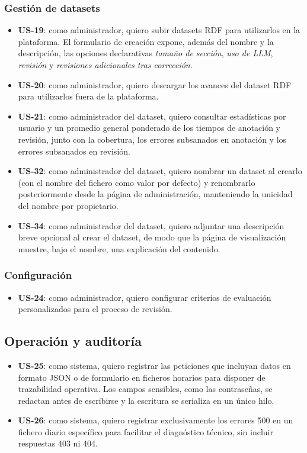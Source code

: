 \subsubsection{Gestión de datasets}
\begin{itemize}
	\item \textbf{US-19}: como administrador, quiero subir datasets RDF para utilizarlos
	      en la plataforma. El formulario de creación expone, además del nombre y la
	      descripción, las opciones declarativas \textit{tamaño de sección}, \textit{uso
		      de LLM}, \textit{revisión} y \textit{revisiones adicionales tras corrección}.
	\item \textbf{US-20}: como administrador, quiero descargar los avances del dataset
	      RDF para utilizarlos fuera de la plataforma.
	\item \textbf{US-21}: como administrador del dataset, quiero consultar estadísticas
	      por usuario y un promedio general ponderado de los tiempos de anotación y
	      revisión, junto con la cobertura, los errores subsanados en anotación y los
	      errores subsanados en revisión.
	\item \textbf{US-32}: como administrador del dataset, quiero nombrar un dataset al
	      crearlo (con el nombre del fichero como valor por defecto) y renombrarlo
	      posteriormente desde la página de administración, manteniendo la unicidad del
	      nombre por propietario.
	\item \textbf{US-34}: como administrador del dataset, quiero adjuntar una descripción
	      breve opcional al crear el dataset, de modo que la página de visualización
	      muestre, bajo el nombre, una explicación del contenido.
\end{itemize}

\subsubsection{Configuración}
\begin{itemize}
	\item \textbf{US-24}: como administrador, quiero configurar criterios de evaluación
	      personalizados para el proceso de revisión.
\end{itemize}

\subsection{Operación y auditoría}

\begin{itemize}
	\item \textbf{US-25}: como sistema, quiero registrar las peticiones que incluyan
	      datos en formato JSON o de formulario en ficheros horarios para disponer de
	      trazabilidad operativa. Los campos sensibles, como las contraseñas, se redactan
	      antes de escribirse y la escritura se serializa en un único hilo.
	\item \textbf{US-26}: como sistema, quiero registrar exclusivamente los errores 500
	      en un fichero diario específico para facilitar el diagnóstico técnico, sin
	      incluir respuestas 403 ni 404.
\end{itemize}

